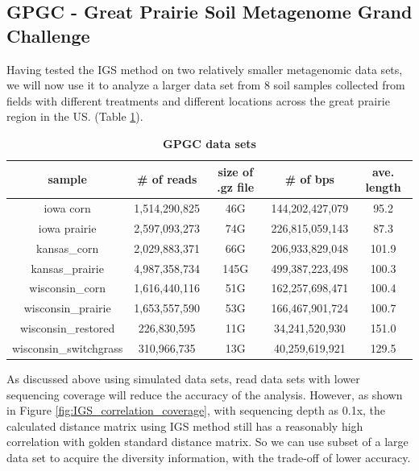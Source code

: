 \subsection{GPGC - Great Prairie Soil Metagenome Grand Challenge}

Having tested the IGS method on two relatively smaller metagenomic data sets, 
we will now use it to analyze 
a larger data set from 8 soil samples collected from fields with different treatments and
different locations across the great prairie region in the US. 
(Table \ref{table:gpgc}). 



\begin{table}[h]
\centering
\begin{tabular}{|c|c|c|c|c|}
\hline
sample & \# of reads & size of .gz file & \# of bps & ave. length \\ \hline
iowa corn & 1,514,290,825 & 46G & 144,202,427,079 & 95.2 \\ 
iowa prairie & 2,597,093,273 & 74G & 226,815,059,143 & 87.3 \\ 
kansas\_corn & 2,029,883,371 & 66G & 206,933,829,048 & 101.9 \\ 
kansas\_prairie & 4,987,358,734 & 145G & 499,387,223,498 & 100.3 \\ 
wisconsin\_corn & 1,616,440,116 & 51G & 162,257,698,471 & 100.4 \\ 
wisconsin\_prairie & 1,653,557,590 & 53G & 166,467,901,724 & 100.7 \\
wisconsin\_restored & 226,830,595 & 11G & 34,241,520,930 & 151.0 \\ 
wisconsin\_switchgrass & 310,966,735 & 13G & 40,259,619,921 & 129.5 \\ \hline
\end{tabular}
\caption{\bf{GPGC data sets}}
\label{table:gpgc}
\end{table}



As discussed above using simulated data sets, read data sets with lower sequencing coverage will reduce
the accuracy of the analysis. However, as shown in Figure \ref{fig:IGS_correlation_coverage}, with sequencing depth
as 0.1x, the calculated distance matrix using IGS method still has a reasonably high correlation with golden standard
distance matrix. So we can use subset of a large data set to acquire the diversity information, with the trade-off of
lower accuracy. 

